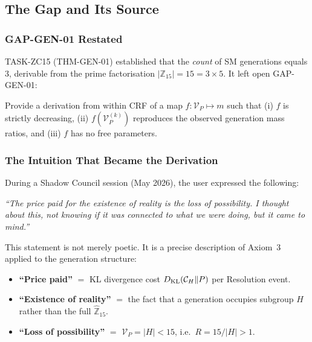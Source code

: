 \documentclass[12pt, a4paper]{article}
\begin{document}
\tableofcontents
\newpage

\subsection{The Gap and Its Source}
\label{zc16:sec:gap}

\subsubsection{GAP-GEN-01 Restated}

TASK-ZC15 (THM-GEN-01) established that the \emph{count} of SM
generations equals 3, derivable from the prime factorisation
$|\mathbb{Z}_{15}| = 15 = 3 \times 5$. It left open GAP-GEN-01:

\begin{formalbox}[title={GAP-GEN-01 (ZC15): Mass ordering open}]
Provide a derivation from within CRF of a map
$f: \mathcal{V}_P \mapsto m$ such that (i) $f$ is strictly
decreasing, (ii) $f(\mathcal{V}_P^{(k)})$ reproduces the observed
generation mass ratios, and (iii) $f$ has no free parameters.
\end{formalbox}

\subsubsection{The Intuition That Became the Derivation}

During a Shadow Council session (May 2026), the user expressed
the following:

\begin{keybox}[title={Origin statement (May 2026)}]
\textit{``The price paid for the existence of reality is the loss
of possibility. I thought about this, not knowing if it was
connected to what we were doing, but it came to mind.''}
\end{keybox}

This statement is not merely poetic. It is a precise description
of Axiom~3 applied to the generation structure:

\begin{itemize}[leftmargin=*, noitemsep]
  \item \textbf{``Price paid''} $=$ KL divergence cost
    $D_{\rm KL}(\mathcal{C}_H \| P)$ per Resolution event.
  \item \textbf{``Existence of reality''} $=$ the fact that
    a generation occupies subgroup $H$ rather than the full
    $\widehat{\mathbb{Z}}_{15}$.
  \item \textbf{``Loss of possibility''} $=$ $\mathcal{V}_P = |H|
    < 15$, i.e.\ $R = 15/|H| > 1$.
\end{itemize}
\end{document}
